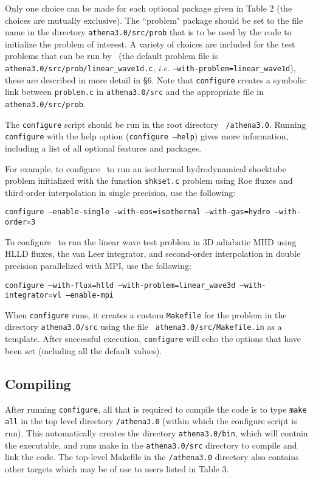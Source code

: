 Only one choice can be made for each optional package given in Table 2
(the choices are mutually exclusive).  The ``problem" package should be
set to the file name in the directory {\tt athena3.0/src/prob} that is
to be used by the code to initialize the problem of interest.  A variety
of choices are included for the test problems that can be run by \ath\
(the default problem file is {\tt athena3.0/src/prob/linear\_wave1d.c},
{\it i.e.} {\tt --with-problem=linear\_wave1d}), these are described in
more detail in \S 6.  Note that {\tt configure} creates a symbolic link
between {\tt problem.c} in {\tt athena3.0/src} and the appropriate file
in {\tt athena3.0/src/prob}.

The {\tt configure} script should be run in the root directory {\tt
/athena3.0}.  Running {\tt configure} with the help option ({\tt configure
--help}) gives more information, including a list of all optional features
and packages.

For example, to configure \ath\ to run an isothermal hydrodynamical shocktube
problem initialized with the function {\tt shkset.c} problem
using Roe fluxes and third-order interpolation in single precision, use the
following:
\begin{center}
{\tt configure --enable-single --with-eos=isothermal --with-gas=hydro --with-order=3}
\end{center}

To configure \ath\ to run the linear wave test problem in 3D adiabatic
MHD using HLLD fluxes, the van Leer integrator, and second-order interpolation in double precision
parallelized with MPI, use the following:
\begin{center}
{\tt configure --with-flux=hlld --with-problem=linear\_wave3d --with-integrator=vl --enable-mpi}
\end{center}

When {\tt configure} runs, it creates a custom {\tt Makefile} for the
problem in the directory {\tt athena3.0/src} using the file {\tt
athena3.0/src/Makefile.in} as a template.  After successful execution,
{\tt configure} will echo the options that have been set (including all
the default values).

\subsection{Compiling \ath}

After running {\tt configure}, all that is required to compile the code
is to type {\tt make all} in the top level directory {\tt /athena3.0}
(within which the configure script is run).  This automatically creates
the directory {\tt athena3.0/bin}, which will contain the executable,
and runs make in the {\tt athena3.0/src} directory to compile and link
the code.  The top-level Makefile in the {\tt /athena3.0} directory also
contains other targets which may be of use to users listed in Table 3.

